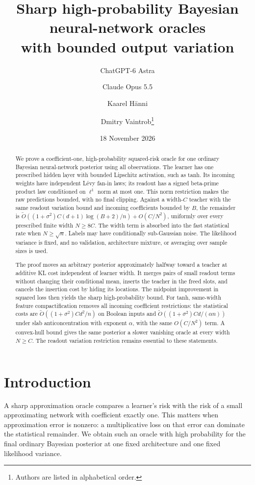 \documentclass[11pt]{article}
\title{Sharp high-probability Bayesian neural-network oracles\\with bounded output variation}
\author{ChatGPT-6 Astra \and Claude Opus 5.5 \and Kaarel H\"anni \and Dmitry Vaintrob\thanks{Authors are listed in alphabetical order.}}
\date{18 November 2026}
\begin{document}
\maketitle
\begin{abstract}
We prove a coefficient-one, high-probability squared-risk oracle for one ordinary Bayesian neural-network posterior using all observations. The learner has one prescribed hidden layer with bounded Lipschitz activation, such as tanh. Its incoming weights have independent L\'evy fan-in laws; its readout has a signed beta-prime product law conditioned on $\ell^1$ norm at most one. This norm restriction makes the raw predictions bounded, with no final clipping. Against a width-$C$ teacher with the same readout variation bound and incoming coefficients bounded by $B$, the remainder is
$\widetilde O((1+\sigma^2)C(d+1)\log(B+2)/n)+O(C/N^2)$,
uniformly over every prescribed finite width $N\ge8C$. The width term is absorbed into the fast statistical rate when $N\ge\sqrt n$.
Labels may have conditionally sub-Gaussian noise. The likelihood variance is fixed, and no validation, architecture mixture, or averaging over sample sizes is used.

The proof moves an arbitrary posterior approximately halfway toward a teacher at additive KL cost independent of learner width. It merges pairs of small readout terms without changing their conditional mean, inserts the teacher in the freed slots, and cancels the insertion cost by hiding its locations. The midpoint improvement in squared loss then yields the sharp high-probability bound. For tanh, same-width feature compactification removes all incoming coefficient restrictions: the statistical costs are $\widetilde O((1+\sigma^2)Cd^2/n)$ on Boolean inputs and $\widetilde O((1+\sigma^2)Cd/(\alpha n))$ under slab anticoncentration with exponent $\alpha$, with the same $O(C/N^2)$ term. A convex-hull bound gives the same posterior a slower vanishing oracle at every width $N\ge C$. The readout variation restriction remains essential to these statements.
\end{abstract}

\section{Introduction}
A sharp approximation oracle compares a learner's risk with the risk of a small approximating network with coefficient exactly one. This matters when approximation error is nonzero: a multiplicative loss on that error can dominate the statistical remainder. We obtain such an oracle with high probability for the final ordinary Bayesian posterior at one fixed architecture and one fixed likelihood variance.
\end{document}
